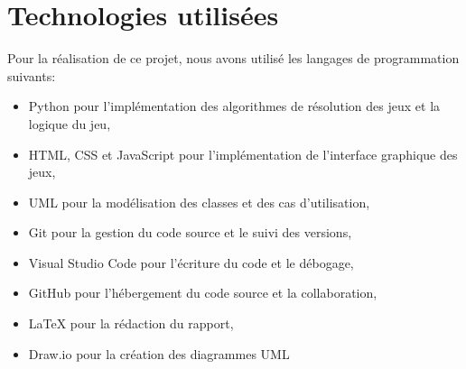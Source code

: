\section{Technologies utilisées}

Pour la réalisation de ce projet, nous avons utilisé les langages de programmation suivants:
\begin{itemize}
	\item Python pour l'implémentation des algorithmes de résolution des jeux et la logique du jeu,
	\item HTML, CSS et JavaScript pour l'implémentation de l'interface graphique des jeux,
	\item UML pour la modélisation des classes et des cas d'utilisation,
	\item Git pour la gestion du code source et le suivi des versions,
	\item Visual Studio Code pour l'écriture du code et le débogage,
	\item GitHub pour l'hébergement du code source et la collaboration,
	\item LaTeX pour la rédaction du rapport,
	\item Draw.io pour la création des diagrammes UML
\end{itemize}

